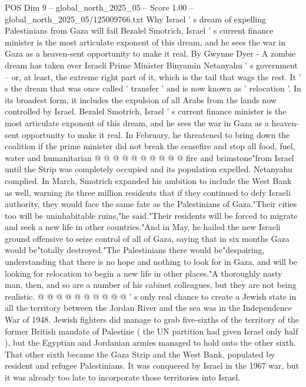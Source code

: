\begin{textsample}{POS Dim 9 – global\_north\_2025\_05 – Score 1.00 – global\_north\_2025\_05/125009766.txt}  \label{ex:f9_pos_267}
Why Israel ' s dream of expelling Palestinians from Gaza will fail Bezalel Smotrich, Israel ' s current finance minister is the most articulate exponent of this dream, and he sees the war in Gaza as a heaven-sent opportunity to make it real.
By Gwynne Dyer - A zombie dream has taken over Israeli Prime Minister Binyamin Netanyahu ' s government -- or, at least, the extreme right part of it, which is the tail that wags the rest.
It ' s the dream that was once called ' transfer ' and is now known as ' relocation '.
In its broadest form, it includes the expulsion of all Arabs from the lands now controlled by Israel.
Bezalel Smotrich, Israel ' s current finance minister is the most articulate exponent of this dream, and he sees the war in Gaza as a heaven-sent opportunity to make it real.
In February, he threatened to bring down the coalition if the prime minister did not break the ceasefire and stop all food, fuel, water and humanitarian @ @ @ @ @ @ @ @ @ @ fire and brimstone"from Israel until the Strip was completely occupied and its population expelled.
Netanyahu complied.
In March, Smotrich expanded his ambition to include the West Bank as well, warning its three million residents that if they continued to defy Israeli authority, they would face the same fate as the Palestinians of Gaza."Their cities too will be uninhabitable ruins,"he said."Their residents will be forced to migrate and seek a new life in other countries."And in May, he hailed the new Israeli ground offensive to seize control of all of Gaza, saying that in six months Gaza would be"totally destroyed."The Palestinians there would be"despairing, understanding that there is no hope and nothing to look for in Gaza, and will be looking for relocation to begin a new life in other places."A thoroughly nasty man, then, and so are a number of his cabinet colleagues, but they are not being realistic. @ @ @ @ @ @ @ @ @ @ ' s only real chance to create a Jewish state in all the territory between the Jordan River and the sea was in the Independence War of 1948.
Jewish fighters did manage to grab five-sixths of the territory of the former British mandate of Palestine ( the UN partition had given Israel only half ), but the Egyptian and Jordanian armies managed to hold onto the other sixth.
That other sixth became the Gaza Strip and the West Bank, populated by resident and refugee Palestinians.
It was conquered by Israel in the 1967 war, but it was already too late to incorporate those territories into Israel.

\end{textsample}
